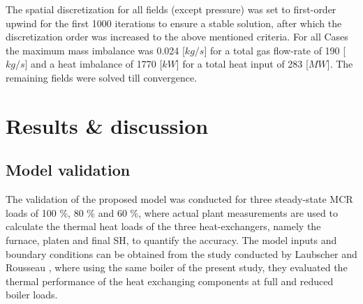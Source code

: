 \documentclass[review]{elsarticle}
\begin{document}
The spatial discretization for all fields (except pressure) was set to first-order upwind for the first 1000 iterations to ensure a stable solution, after which the discretization order was increased to the above mentioned criteria. For all Cases the maximum mass imbalance was 0.024 [$kg/s$] for a total gas flow-rate of 190 [$kg/s$] and a heat imbalance of 1770 [$kW$] for a total heat input of 283 [$MW$]. The remaining fields were solved till convergence.

\section{Results \& discussion}
\subsection{Model validation}\label{sec_model_valid}
The validation of the proposed model was conducted for three steady-state MCR loads of 100 \%, 80 \% and 60 \%, where actual plant measurements are used to calculate the
thermal heat loads of the three heat-exchangers, namely the furnace, platen and final SH, to quantify the accuracy. The model inputs and boundary conditions can be obtained from the study conducted by Laubscher and Rousseau \citep{Laubscher2019b}, where using the same boiler of the present study, they evaluated the thermal performance of the heat exchanging components at full and reduced boiler loads.
\end{document}
